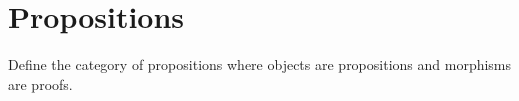 
\section{Propositions}
\label{sec:propositions}

\begin{publictodo}
    Define the category of propositions where objects are propositions and morphisms are proofs.
\end{publictodo}


\devel{} %

